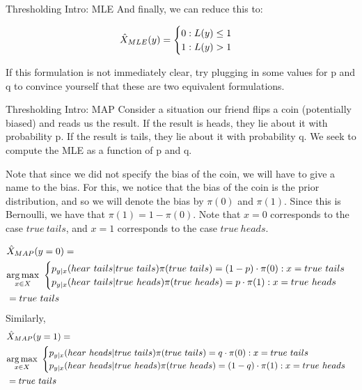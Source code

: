 \begin{exmp}{Thresholding Intro: MLE}{}
And finally, we can reduce this to:

\begin{align*}
  {\hat{X}_{MLE}} (y) =
  \begin{cases}
	0 : L(y) \leq 1 \\
	1 : L(y) > 1
	\end{cases} 
\end{align*}

If this formulation is not immediately clear, try plugging in some values for p and q to convince yourself that these are two equivalent formulations.

\end{exmp}


\begin{exmp}{Thresholding Intro: MAP}{}
Consider a situation our friend flips a coin (potentially biased) and reads us the result. If the result is heads, they lie about it with probability p. If the result is tails, they lie about it with probability q. We seek to compute the MLE as a function of p and q. \newline 

Note that since we did not specify the bias of the coin, we will have to give a name to the bias. For this, we notice that the bias of the coin is the prior distribution, and so we will denote the bias by \(\pi(0)\) and \(\pi(1)\). Since this is Bernoulli, we have that \(\pi(1) = 1- \pi(0)\). Note that \(x = 0\) corresponds to the case \(true \ tails\), and \(x = 1\) corresponds to the case \(true \ heads\).


\begin{align*}
  &\MAP (y=0) = \\
  &\underset{x\in X}{\argmax}\ 
\begin{cases}
	p_{y|x}(hear\ tails|true\ tails)\pi(true\ tails) = (1-p) \cdot \pi(0) : x=true \ tails \\
	p_{y|x}(hear\ tails|true\ heads)\pi(true\ heads) = p \cdot \pi(1) : x=true\ heads
\end{cases} 
\\
&= true \ tails
\end{align*}
Similarly,
\begin{align*}
  &\MAP (y=1) = \\
  &\underset{x\in X}{\argmax}\ 
\begin{cases}
	p_{y|x}(hear\ heads|true\ tails)\pi(true\ tails) = q \cdot\pi(0):x=true \ tails \\
	p_{y|x}(hear\ heads|true\ heads)\pi(true\ heads) = (1-q)\cdot\pi(1) :x=true\ heads
\end{cases} 
\\
&= true \ tails
\end{align*}


\end{exmp}
